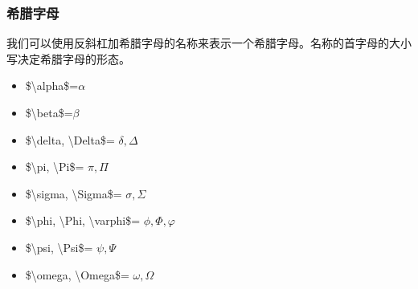 \documentclass{article}
\begin{document}
\subsubsection{希腊字母}
我们可以使用反斜杠加希腊字母的名称来表示一个希腊字母。名称的首字母的大小写决定希腊字母的形态。
\begin{itemize}
\item \$\textbackslash alpha\$=$\alpha$
\item \$\textbackslash beta\$=$\beta$
\item \$\textbackslash delta, \textbackslash Delta\$=							$\delta, \Delta$
\item \$\textbackslash pi, \textbackslash Pi\$=									$\pi, \Pi$
\item \$\textbackslash sigma, \textbackslash Sigma\$=							$\sigma, \Sigma$
\item \$\textbackslash phi, \textbackslash Phi, \textbackslash varphi\$=	$\phi, \Phi, \varphi$
\item \$\textbackslash psi, \textbackslash Psi\$=								$\psi, \Psi$
\item \$\textbackslash omega, \textbackslash Omega\$=							$\omega, \Omega$
\end{itemize}
\end{document}
